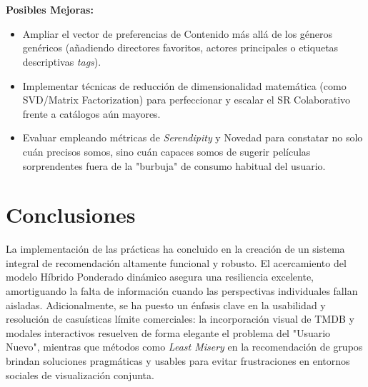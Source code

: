 \documentclass[12pt]{scrartcl}
\begin{document}
\\\\
\textbf{Posibles Mejoras:} \\
\begin{itemize}
    \item Ampliar el vector de preferencias de Contenido más allá de los géneros genéricos (añadiendo directores favoritos, actores principales o etiquetas descriptivas \textit{tags}).
    \item Implementar técnicas de reducción de dimensionalidad matemática (como SVD/Matrix Factorization) para perfeccionar y escalar el SR Colaborativo frente a catálogos aún mayores.
    \item Evaluar empleando métricas de \textit{Serendipity} y Novedad para constatar no solo cuán precisos somos, sino cuán capaces somos de sugerir películas sorprendentes fuera de la "burbuja" de consumo habitual del usuario.
\end{itemize}

\section{Conclusiones}
La implementación de las prácticas ha concluido en la creación de un sistema integral de recomendación altamente funcional y robusto.
El acercamiento del modelo Híbrido Ponderado dinámico asegura una resiliencia excelente, amortiguando la falta de información cuando las perspectivas individuales fallan aisladas. Adicionalmente, se ha puesto un énfasis clave en la usabilidad y resolución de casuísticas límite comerciales: la incorporación visual de TMDB y modales interactivos resuelven de forma elegante el problema del "Usuario Nuevo", mientras que métodos como \textit{Least Misery} en la recomendación de grupos brindan soluciones pragmáticas y usables para evitar frustraciones en entornos sociales de visualización conjunta. 
\end{document}
